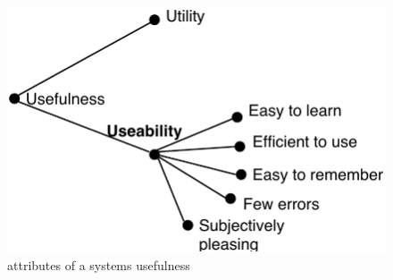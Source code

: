 \begin{figure}[bt]
\centering
\includegraphics[width=0.4\columnwidth]{Images/ux_useability.pdf}
\caption{attributes of a systems usefulness }
\label{fig:ux_useability}
\end{figure}
